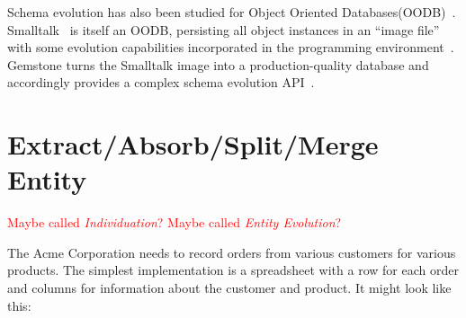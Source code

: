 \documentclass[english,submission]{programming}
\begin{document}
Schema evolution has also been studied for Object Oriented Databases(OODB)~\cite{li99,banerjee87}. Smalltalk~\cite{Goldberg80} is itself an OODB, persisting all object instances in an ``image file'' with some evolution capabilities incorporated in the programming environment~\cite[pp.252-272]{Goldberg80}. Gemstone turns the Smalltalk image into a production-quality database and accordingly provides a complex schema evolution API~\cite{Gemstone}.

\newpage

\section{Extract/Absorb/Split/Merge Entity}
\textcolor{red}{Maybe called \textit{Individuation}? Maybe called \textit{Entity Evolution}?}

The Acme Corporation needs to record orders from various customers for various products. The simplest implementation is a spreadsheet with a row for each order and columns for information about the customer and product. It might look like this:
\end{document}
